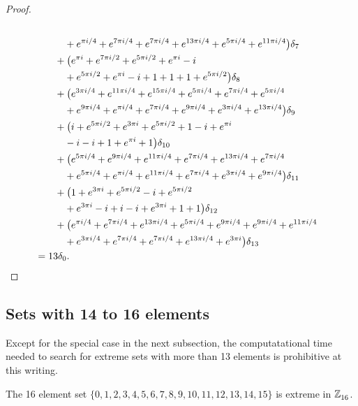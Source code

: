 \begin{proof}
\begin{align*}
\\& \quad\qquad
+ e^{\pi i / 4}+ e^{ 7 \pi i / 4}+ e^{ 7 \pi i / 4}+ e^{ 13 \pi i / 4}+ e^{ 5 \pi i / 4}+ e^{ 11 \pi i / 4}\big)\delta_{7} 
 \\& \qquad  +  \big( e^{ \pi  i}+ e^{ 7 \pi i / 2}+ e^{ 5 \pi i / 2}+ e^{ \pi  i}- i
\\& \quad\qquad
+ e^{ 5 \pi i / 2}+ e^{ \pi  i}- i+ 1+ 1+ 1+ e^{ 5 \pi i / 2}\big)\delta_{8} 
 \\& \qquad  +  \big( e^{ 3 \pi i / 4}+ e^{ 11 \pi i / 4}+ e^{ 15 \pi i / 4}+ e^{ 5 \pi i / 4}+ e^{ 7 \pi i / 4}+ e^{ 5 \pi i / 4}
\\& \quad\qquad
+ e^{ 9 \pi i / 4}+ e^{\pi i / 4}+ e^{ 7 \pi i / 4}+ e^{ 9 \pi i / 4}+ e^{ 3 \pi i / 4}+ e^{ 13 \pi i / 4}\big)\delta_{9} 
 \\& \qquad  +  \big(  i + e^{ 5 \pi i / 2}+ e^{ 3 \pi i}+ e^{ 5 \pi i / 2}+ 1- i+ e^{ \pi  i}
\\& \quad\qquad
- i- i+ 1+ e^{ \pi  i}+ 1\big)\delta_{10} 
 \\& \qquad  +  \big( e^{ 5 \pi i / 4}+ e^{ 9 \pi i / 4}+ e^{ 11 \pi i / 4}+ e^{ 7 \pi i / 4}+ e^{ 13 \pi i / 4}+ e^{ 7 \pi i / 4}
\\& \quad\qquad
+ e^{ 5 \pi i / 4}+ e^{\pi i / 4}+ e^{ 11 \pi i / 4}+ e^{ 7 \pi i / 4}+ e^{ 3 \pi i / 4}+ e^{ 9 \pi i / 4}\big)\delta_{11} 
 \\& \qquad  +  \big( 1+ e^{ 3 \pi i}+ e^{ 5 \pi i / 2}- i+ e^{ 5 \pi i / 2}
\\& \quad\qquad
+ e^{ 3 \pi i}- i+  i - i+ e^{ 3 \pi i}+ 1+ 1\big)\delta_{12} 
 \\& \qquad  +  \big( e^{\pi i / 4}+ e^{ 7 \pi i / 4}+ e^{ 13 \pi i / 4}+ e^{ 5 \pi i / 4}+ e^{ 9 \pi i / 4}
+ e^{ 9 \pi i / 4}+ e^{ 11 \pi i / 4}\\& \quad\qquad+ e^{ 3 \pi i / 4}+ e^{ 7 \pi i / 4}+ e^{ 7 \pi i / 4}+ e^{ 13 \pi i / 4}+ e^{ 3 \pi i}\big)\delta_{13} \
\\&= 13\delta_0.
\qedhere
\end{align*}
\end{proof}

\subsection{Sets with 14 to 16 elements}
Except for the special case in the next subsection, the computatational time needed to search for extreme
sets with more than 13 elements is prohibitive at this writing.

\begin{prop}\label{proppp16inZ16}
The 16 element set $\{0,  1,  2,  3,  4,  5,  6,  7,  8,  9,  10,  11,  12,  13,  14,  15 \}$ is extreme in $\texttt{$\mathbb Z_{16}^{\,}$}$. \newline \end{prop} 


